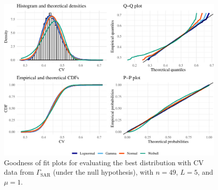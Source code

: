 \documentclass[remotesensing,article,submit,moreauthors,pdftex]{Definitions/mdpi}
\providecommand{\DIFaddbeginFL}{} %
\providecommand{\DIFaddendFL}{} %
\providecommand{\DIFdelbeginFL}{} %
\providecommand{\DIFdelendFL}{} %
\newcommand{\DIFscaledelfig}{0.5}
\newlength{\DIFdelgraphicswidth} %
\newlength{\DIFdelgraphicsheight} %
\newcommand{\DIFaddincludegraphics}[2][]{{\color{blue}\fbox{\DIFOincludegraphics[#1]{#2}}}} %
\newcommand{\DIFdelincludegraphics}[2][]{%
\sbox{\DIFdelgraphicsbox}{\DIFOincludegraphics[#1]{#2}}%
\settoboxwidth{\DIFdelgraphicswidth}{\DIFdelgraphicsbox} %
\settoboxtotalheight{\DIFdelgraphicsheight}{\DIFdelgraphicsbox} %
\scalebox{\DIFscaledelfig}{%
\parbox[b]{\DIFdelgraphicswidth}{\usebox{\DIFdelgraphicsbox}\\[-\baselineskip] \rule{\DIFdelgraphicswidth}{0em}}\llap{\resizebox{\DIFdelgraphicswidth}{\DIFdelgraphicsheight}{%
\setlength{\unitlength}{\DIFdelgraphicswidth}%
\begin{picture}(1,1)%
\thicklines\linethickness{2pt} %
{\color[rgb]{1,0,0}\put(0,0){\framebox(1,1){}}}%
{\color[rgb]{1,0,0}\put(0,0){\line( 1,1){1}}}%
{\color[rgb]{1,0,0}\put(0,1){\line(1,-1){1}}}%
\end{picture}%
}\hspace*{3pt}}} %
} %
\DeclareRobustCommand{\DIFaddbeginFL}{\DIFOaddbeginFL \let\includegraphics\DIFaddincludegraphics} %
\DeclareRobustCommand{\DIFaddendFL}{\DIFOaddendFL \let\includegraphics\DIFOincludegraphics} %
\DeclareRobustCommand{\DIFdelbeginFL}{\DIFOdelbeginFL \let\includegraphics\DIFdelincludegraphics} %
\DeclareRobustCommand{\DIFdelendFL}{\DIFOaddendFL \let\includegraphics\DIFOincludegraphics} %
\begin{document}
\begin{figure}[H]

{\centering \DIFdelbeginFL %
\DIFdelendFL \DIFaddbeginFL \includegraphics[width=1\linewidth]{R1-Identifying-Heterogeneity-in-SAR-Data-with-New-Test-Statistics_files/figure-latex/Plot_cv_gamma-1} 
\DIFaddendFL 

}

\caption{Goodness of fit plots for evaluating the best distribution with CV data from $\Gamma_{\text{SAR}}$ (under the null hypothesis), with $n=49$, $L=5$, and $\mu=1$.}\label{fig:Plot_cv_gamma}
\end{figure}
\end{document}
